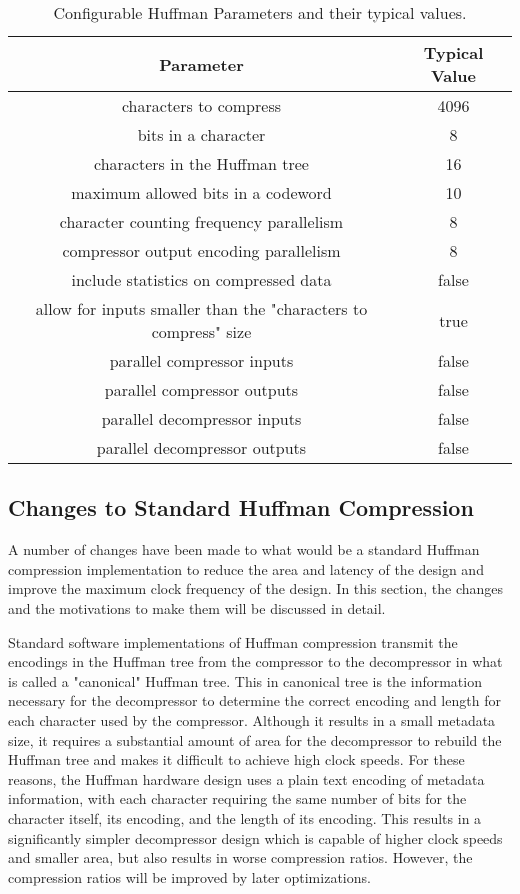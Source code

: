 \documentclass[doublespace,draft,nopageskip]{VTthesis} %
\begin{document}
\begin{table}[htb]
	\centering
	\caption{Configurable Huffman Parameters and their typical values.}
	\begin{tabular}{|c|c|}
	    \hline
	    Parameter & Typical Value \\
	    \hline
	    characters to compress & 4096 \\
	    \hline
	    bits in a character & 8 \\
	    \hline
	    characters in the Huffman tree & 16 \\
	    \hline
	    maximum allowed bits in a codeword & 10 \\
	    \hline
	    character counting frequency parallelism & 8 \\
	    \hline
	    compressor output encoding parallelism & 8 \\
	    \hline
	    include statistics on compressed data & false \\
	    \hline
	    allow for inputs smaller than the "characters to compress" size & true \\
	    \hline
	    parallel compressor inputs & false \\
	    \hline
	    parallel compressor outputs & false \\
	    \hline
	    parallel decompressor inputs & false \\ 
	    \hline
	    parallel decompressor outputs & false \\
	    \hline
	\end{tabular}
	\label{tab:huffman-configuration-table}
\end{table}

\subsection{Changes to Standard Huffman Compression}\label{ss:changes_to_standard_huffman_compression}
A number of changes have been made to what would be a standard Huffman compression implementation to reduce the area and latency of the design and improve the maximum clock frequency of the design. In this section, the changes and the motivations to make them will be discussed in detail.

Standard software implementations of Huffman compression transmit the encodings in the Huffman tree from the compressor to the decompressor in what is called a "canonical" Huffman tree. This in canonical tree is the information necessary for the decompressor to determine the correct encoding and length for each character used by the compressor. Although it results in a small metadata size, it requires a substantial amount of area for the decompressor to rebuild the Huffman tree and makes it difficult to achieve high clock speeds. For these reasons, the Huffman hardware design uses a plain text encoding of metadata information, with each character requiring the same number of bits for the character itself, its encoding, and the length of its encoding. This results in a significantly simpler decompressor design which is capable of higher clock speeds and smaller area, but also results in worse compression ratios. However, the compression ratios will be improved by later optimizations.
\end{document}
